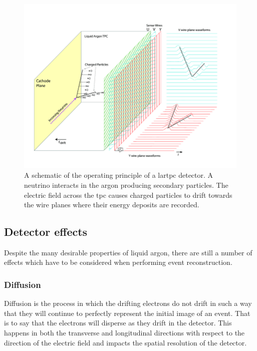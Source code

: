 \begin{figure}[h]
    \centering
    \includegraphics[width =\largefigwidth]{figures-chap3/Operational-principle-of-the-MicroBooNE-LArTPC.png}
    \caption[Schematic of LArTPC detector.]{A schematic of the operating principle of a \gls{lartpc} detector. A neutrino interacts in the argon producing secondary particles. The electric field across the \gls{tpc} causes charged particles to drift towards the wire planes where their energy deposits are recorded. \cite{Design_and_Construction_of_the_MicroBooNE_Detector}}
    \label{fig:lartpc}
\end{figure}
\newpage

\subsection{Detector effects}

Despite the many desirable properties of liquid argon, there are still a number of effects which have to be considered when performing event reconstruction.

\subsubsection{Diffusion}

Diffusion is the process in which the drifting electrons do not drift in such a way that they will continue to perfectly represent the initial image of an event. That is to say that the electrons will disperse as they drift in the detector. This happens in both the transverse and longitudinal directions with respect to the direction of the electric field and impacts the spatial resolution of the detector. 

